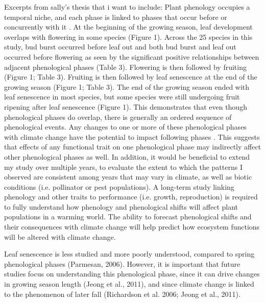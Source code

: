 \documentclass{article}
\begin{document}
Excerpts from sally's thesis that i want to include:
Plant phenology occupies a temporal niche, and each phase is linked to phases that occur before or concurrently with it  \citep{wolkovich2014}. At the beginning of the growing season, leaf development overlaps with flowering in some species (Figure 1). Across the 25 species in this study, bud burst occurred before leaf out and both bud burst and leaf out occurred before flowering as seen by the significant positive relationships between adjacent phenological phases (Table 3). Flowering is then followed by fruiting (Figure 1; Table 3). Fruiting is then followed by leaf senescence at the end of the growing season (Figure 1; Table 3). The end of the growing season ended with leaf senescence in most species, but some species were still undergoing fruit ripening after leaf senescence (Figure 1). This demonstrates that even though phenological phases do overlap, there is generally an ordered sequence of phenological events. Any changes to one or more of these phenological phases with climate change have the potential to impact following phases  \citep{wolkovich2014b}. This suggests that effects of any functional trait on one phenological phase may indirectly affect other phenological phases as well.
In addition, it would be beneficial to extend my study over multiple years, to evaluate the extent to which the patterns I observed are consistent among years that may vary in climate, as well as biotic conditions (i.e. pollinator or pest populations). A long-term study linking phenology and other traits to performance (i.e. growth, reproduction) is required to fully understand how phenology and phenological shifts will affect plant populations in a warming world. The ability to forecast phenological shifts and their consequences with climate change will help predict how ecosystem functions will be altered with climate change.

Leaf senescence is less studied and more poorly understood, compared to spring phenological phases (Parmesan, 2006). However, it is important that future studies focus on understanding this phenological phase, since it can drive changes in growing season length (Jeong et al., 2011), and since climate change is linked to the phenomenon of later fall (Richardson et al. 2006; Jeong et al., 2011).
\end{document}
